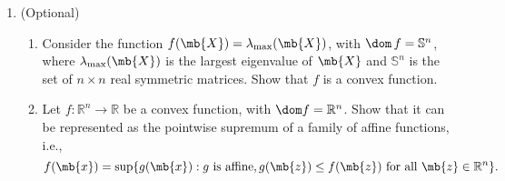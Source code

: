 \begin{exercise}
\begin{enumerate}
    \item (Optional) \begin{enumerate}


        \item
          Consider the function $f(\mb{X})=\lambda_{\max}(\mb{X})$, with $\dom\, f =\mathbb{S}^n$, where $\lambda_{\max}(\mb{X})$ is the largest eigenvalue of $\mb{X}$ and $\mathbb{S}^n$ is the set of $n\times n$ real symmetric matrices. Show that $f$ is a convex function.
        \item
          Let $f:\mathbb{R}^n\to\mathbb{R}$ be a convex function, with $\dom f=\mathbb{R}^n$. Show that it can be represented as the pointwise supremum of a family of affine functions, i.e.,
          $$
            f(\mb{x})=\sup\{ g(\mb{x}): g\text{ is affine},g(\mb{z})\le f(\mb{z}) \text{ for all }\mb{z}\in\mathbb{R}^n\}.
          $$
      \end{enumerate}
      

\end{enumerate}
\end{exercise}
